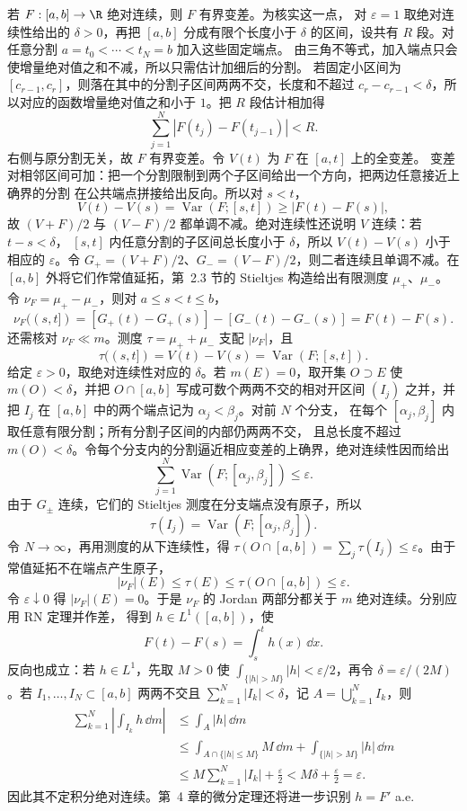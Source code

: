 若 $F:[a,b]\to\R$ 绝对连续，则 $F$ 有界变差。为核实这一点，
对 $\varepsilon=1$ 取绝对连续性给出的 $\delta>0$，再把 $[a,b]$ 分成有限个长度小于
$\delta$ 的区间，设共有 $R$ 段。对任意分割 $a=t_0<\cdots<t_N=b$ 加入这些固定端点。
由三角不等式，加入端点只会使增量绝对值之和不减，所以只需估计加细后的分割。
若固定小区间为 $[c_{r-1},c_r]$，则落在其中的分割子区间两两不交，长度和不超过
$c_r-c_{r-1}<\delta$，所以对应的函数增量绝对值之和小于 $1$。把 $R$ 段估计相加得
\[
 \sum_{j=1}^N|F(t_j)-F(t_{j-1})|<R.
\]
右侧与原分割无关，故 $F$ 有界变差。令 $V(t)$ 为 $F$ 在 $[a,t]$ 上的全变差。
变差对相邻区间可加：把一个分割限制到两个子区间给出一个方向，把两边任意接近上确界的分割
在公共端点拼接给出反向。所以对 $s<t$，
\[
  V(t)-V(s)=\operatorname{Var}(F;[s,t])\ge |F(t)-F(s)|,
\]
故 $(V+F)/2$ 与 $(V-F)/2$ 都单调不减。绝对连续性还说明 $V$ 连续：若 $t-s<\delta$，
$[s,t]$ 内任意分割的子区间总长度小于 $\delta$，所以 $V(t)-V(s)$ 小于相应的
$\varepsilon$。令 $G_+=(V+F)/2$、$G_-=(V-F)/2$，则二者连续且单调不减。在
$[a,b]$ 外将它们作常值延拓，第~2.3 节的 Stieltjes 构造给出有限测度
$\mu_+$、$\mu_-$。令 $\nu_F=\mu_+-\mu_-$，则对 $a\le s<t\le b$，
\[
 \nu_F((s,t])
 =[G_+(t)-G_+(s)]-[G_-(t)-G_-(s)]
 =F(t)-F(s).
\]
还需核对 $\nu_F\ll m$。测度 $\tau=\mu_++\mu_-$ 支配 $|\nu_F|$，且
\[
 \tau((s,t])=V(t)-V(s)=\operatorname{Var}(F;[s,t]).
\]
给定 $\varepsilon>0$，取绝对连续性对应的 $\delta$。若 $m(E)=0$，取开集
$O\supset E$ 使 $m(O)<\delta$，并把 $O\cap[a,b]$ 写成可数个两两不交的相对开区间
$(I_j)$ 之并，并把 $I_j$ 在 $[a,b]$ 中的两个端点记为 $\alpha_j<\beta_j$。对前 $N$ 个分支，
在每个 $[\alpha_j,\beta_j]$ 内取任意有限分割；所有分割子区间的内部仍两两不交，
且总长度不超过 $m(O)<\delta$。令每个分支内的分割逼近相应变差的上确界，绝对连续性因而给出
\[
 \sum_{j=1}^N\operatorname{Var}(F;[\alpha_j,\beta_j])\le\varepsilon.
\]
由于 $G_\pm$ 连续，它们的 Stieltjes 测度在分支端点没有原子，所以
\[
 \tau(I_j)=\operatorname{Var}(F;[\alpha_j,\beta_j]).
\]
令 $N\to\infty$，再用测度的从下连续性，得
$\tau(O\cap[a,b])=\sum_j\tau(I_j)\le\varepsilon$。由于常值延拓不在端点产生原子，
\[
 |\nu_F|(E)\le\tau(E)\le\tau(O\cap[a,b])\le\varepsilon.
\]
令 $\varepsilon\downarrow0$ 得 $|\nu_F|(E)=0$。于是 $\nu_F$ 的 Jordan 两部分都关于 $m$
绝对连续。分别应用 RN 定理并作差，
得到 $h\in L^1([a,b])$，使
\[
  F(t)-F(s)=\int_s^t h(x)\,\dd x.
\]
反向也成立：若 $h\in L^1$，先取 $M>0$ 使
$\int_{\{|h|>M\}}|h|<\varepsilon/2$，再令
$\delta=\varepsilon/(2M)$。若 $I_1,\dots,I_N\subset[a,b]$ 两两不交且
$\sum_{k=1}^N|I_k|<\delta$，记 $A=\bigcup_{k=1}^NI_k$，则
\[
 \begin{aligned}
 \sum_{k=1}^N\left|\int_{I_k}h\,\dd m\right|
 &\le \int_A|h|\,\dd m\\
 &\le \int_{A\cap\{|h|\le M\}}M\,\dd m
      +\int_{\{|h|>M\}}|h|\,\dd m\\
 &\le M\sum_{k=1}^N|I_k|+\frac{\varepsilon}{2}
 <M\delta+\frac{\varepsilon}{2}=\varepsilon.
 \end{aligned}
\]
因此其不定积分绝对连续。第~4 章的微分定理还将进一步识别 $h=F'$ a.e.

